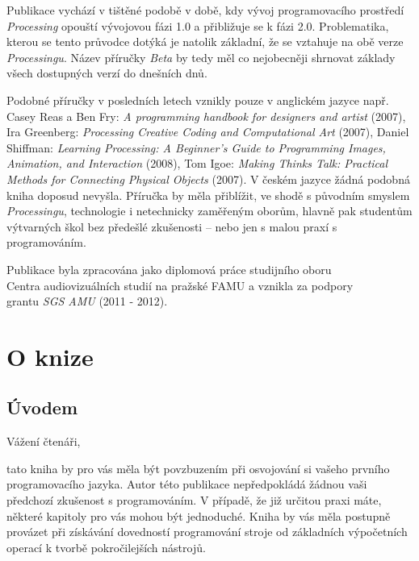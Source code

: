 \documentclass[10pt,twoside=true,open=right,cleardoublepage=empty,chapterprefix=true]{scrbook}
\newcommand{\oddil}[1]{\section{#1}\index{#1}\label{#1}}
\begin{document}
Publikace vychází v tištěné podobě v době, kdy vývoj programovacího prostředí {\em Processing} opouští vývojovou fázi 1.0 a přibližuje se k fázi 2.0. Problematika, kterou se tento průvodce dotýká je natolik základní, že se vztahuje na obě verze {\em Processingu}. Název příručky {\em Beta} by tedy měl co nejobecněji shrnovat základy všech dostupných verzí do dnešních dnů. 

Podobné příručky v posledních letech vznikly pouze v anglickém jazyce např. Casey Reas a Ben Fry: {\em A programming handbook for designers and artist} (2007), Ira Greenberg: {\em Processing Creative Coding and Computational Art}  (2007), Daniel Shiffman: {\em Learning Processing: A Beginner's Guide to Programming Images, Animation, and Interaction}  (2008), Tom Igoe: {\em Making Thinks Talk: Practical Methods for Connecting Physical Objects} (2007). V českém jazyce žádná podobná kniha doposud nevyšla. Příručka by měla přiblížit, ve shodě s původním smyslem {\em Processingu}, technologie i netechnicky zaměřeným oborům, hlavně pak studentům výtvarných škol bez předešlé zkušenosti -- nebo jen s malou praxí s programováním.


Publikace byla zpracována jako diplomová práce studijního oboru \\Centra audiovizuálních studií na pražské FAMU a vznikla za podpory \\grantu {\em SGS AMU} (2011 - 2012). 









\tableofcontents

\vfill
\chapter{O knize}



\vfill
\thispagestyle{empty}



\oddil{Úvodem}


\pagestyle{fancyplain}

Vážení čtenáři,

tato kniha by pro vás měla být povzbuzením při osvojování si vašeho prvního programovacího jazyka. Autor této publikace nepředpokládá žádnou vaši předchozí zkušenost s programováním. V případě, že již určitou praxi máte, některé kapitoly pro vás mohou být jednoduché. Kniha by vás měla postupně provázet při získávání dovedností programování stroje od základních výpočetních operací k tvorbě pokročilejších nástrojů.
\end{document}
